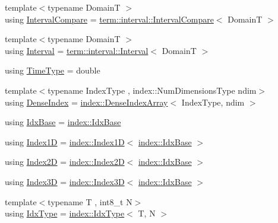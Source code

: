\begin{DoxyCompactItemize}
{\footnotesize template$<$typename DomainT $>$ }\\using \hyperlink{namespacevt_ab51b754f1d22841f555246195fab9d41}{Interval\+Compare} = \hyperlink{structvt_1_1term_1_1interval_1_1_interval_compare}{term\+::interval\+::\+Interval\+Compare}$<$ DomainT $>$
\item 
{\footnotesize template$<$typename DomainT $>$ }\\using \hyperlink{namespacevt_a0036b5cb523aef3477d6d5de9d94eabb}{Interval} = \hyperlink{structvt_1_1term_1_1interval_1_1_interval}{term\+::interval\+::\+Interval}$<$ DomainT $>$
\item 
using \hyperlink{namespacevt_a876a9d0cd5a952859c72de8a46881442}{Time\+Type} = double
\item 
{\footnotesize template$<$typename Index\+Type , index\+::\+Num\+Dimensions\+Type ndim$>$ }\\using \hyperlink{namespacevt_ac016d9c31465ce11c14eab2be11f9183}{Dense\+Index} = \hyperlink{structvt_1_1index_1_1_dense_index_array}{index\+::\+Dense\+Index\+Array}$<$ Index\+Type, ndim $>$
\item 
using \hyperlink{namespacevt_afb96657e28fa98eb685c5e0c6b1b122e}{Idx\+Base} = \hyperlink{namespacevt_1_1index_a0dbb8d47463da27c1436e8e4ddb02743}{index\+::\+Idx\+Base}
\item 
using \hyperlink{namespacevt_a5540efc78234273e1796fb003fe4d234}{Index1D} = \hyperlink{namespacevt_1_1index_a091a4f5a7a2c993d9727eaa60cf67d81}{index\+::\+Index1D}$<$ \hyperlink{namespacevt_1_1index_a0dbb8d47463da27c1436e8e4ddb02743}{index\+::\+Idx\+Base} $>$
\item 
using \hyperlink{namespacevt_a3bab786053b74a3d856fff1412ffa73a}{Index2D} = \hyperlink{namespacevt_1_1index_a8373801efc8343f24d6e8ba57df40a69}{index\+::\+Index2D}$<$ \hyperlink{namespacevt_1_1index_a0dbb8d47463da27c1436e8e4ddb02743}{index\+::\+Idx\+Base} $>$
\item 
using \hyperlink{namespacevt_a2c8053bc5f2df4934272542fb3e5a0bc}{Index3D} = \hyperlink{namespacevt_1_1index_a2c09a09f7346d370a0bcbbfb0d4459cd}{index\+::\+Index3D}$<$ \hyperlink{namespacevt_1_1index_a0dbb8d47463da27c1436e8e4ddb02743}{index\+::\+Idx\+Base} $>$
\item 
{\footnotesize template$<$typename T , int8\+\_\+t N$>$ }\\using \hyperlink{namespacevt_a906c25b521ff516f5e8ba6d96fe2d424}{Idx\+Type} = \hyperlink{namespacevt_1_1index_a939bace7aba6cd4a76b2c12a138c5991}{index\+::\+Idx\+Type}$<$ T, N $>$
\item 

\end{DoxyCompactItemize}
